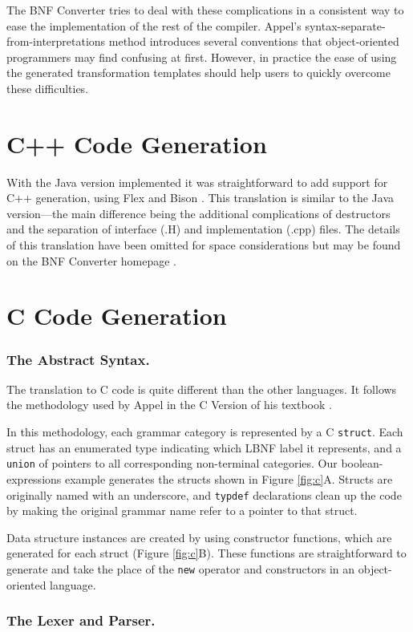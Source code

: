 \documentclass{llncs}
\newcommand{\shortsection}[1]{\subsubsection*{#1.}} %
\begin{document}
The BNF Converter tries to deal with these complications in a consistent way to ease the implementation of the rest of the compiler. Appel's syntax-separate-from-interpretations method introduces several conventions that object-oriented programmers may find confusing at first. However, in practice the ease of using the generated transformation templates should help users to quickly overcome these difficulties.

\section{C++ Code Generation}

With the Java version implemented it was straightforward to add support for C++ generation, using Flex \cite{flex} and Bison \cite{bison}. This translation is similar to the Java version---the main difference being the additional complications of destructors and the separation of interface (.H) and implementation (.cpp) files. The details of this translation have been omitted for space considerations but may be found on the BNF Converter homepage \cite{bnfcsite}.

\section{C Code Generation}

\shortsection{The Abstract Syntax}

The translation to C code is quite different than the other languages. It follows the methodology used by Appel in the C Version of his textbook \cite{AppelC}.

In this methodology, each grammar category is represented by a C \texttt{struct}. Each struct has an enumerated type indicating which LBNF label it represents, and a \texttt{union} of pointers to all corresponding non-terminal categories. Our boolean-expressions example generates the structs shown in Figure \ref{fig:c}A. Structs are originally named with an underscore, and \texttt{typdef} declarations clean up the code by making the original grammar name refer to a pointer to that struct.

Data structure instances are created by using constructor functions, which are generated for each struct (Figure \ref{fig:c}B). These functions are straightforward to generate and take the place of the \texttt{new} operator and constructors in an object-oriented language.


\shortsection{The Lexer and Parser}
\end{document}
